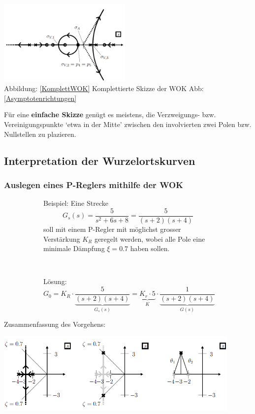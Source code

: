 \begin{enumerate}
\begin{multicols}{2}
\includegraphics[width=6.5cm]{./images/KomplettWOK.png}\\
Abbildung: \ref{KomplettWOK} {Komplettierte Skizze der WOK Abb: \ref{Asymptotenrichtungen}} \label{KomplettWOK}
\end{multicols}
Für eine \textbf{einfache Skizze} genügt es meistens, die Verzweigungs- bzw. Vereinigungspunkte ‘etwa in der Mitte’ zwischen den involvierten zwei Polen bzw. Nullstellen zu plazieren.
\end{enumerate}

\subsection{Interpretation der Wurzelortskurven }

\subsubsection{Auslegen eines P-Reglers mithilfe der WOK }
\begin{figure}[h!]
	\begin{subfigure}[t]{8.5cm}
Beispiel: Eine Strecke \[G_s(s)=\frac{5}{s^2 + 6s +8}=\frac{5}{(s+2)(s+4)}\] soll mit einem P-Regler mit
 möglichst grosser Verstärkung $K_R$ geregelt werden, wobei alle Pole eine minimale
 Dämpfung $\xi = 0.7$ haben sollen.\\


	\end{subfigure}$\qquad$
	\begin{subfigure}[t]{10cm}
		Lösung:
		 \[G_0=K_R\cdot\underbrace{\frac{5}{(s+2)(s+4)}}_{G_s(s)}=\underbrace{K_r\cdot 5}_{K} \cdot\underbrace{\frac{1}{(s+2)(s+4)}}_{G(s)}\]
	\end{subfigure}
\end{figure}

Zusammenfassung des Vorgehens:\\
\begin{center}
    \includegraphics[width=12cm]{./images/PReglerBeispielWOK2.png}
\end{center}

